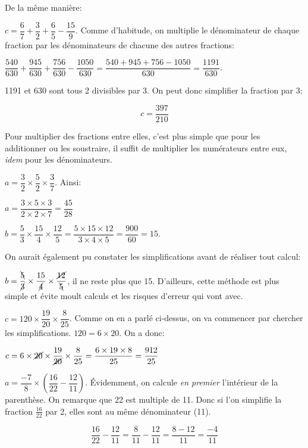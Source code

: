 \documentclass[a4paper,12pt]{scrartcl}
\begin{document}
\question{}
De la même manière:

$c = \dfrac{6}{7} + \dfrac{3}{2} + \dfrac{6}{5} - \dfrac{15}{9}$. Comme d'habitude, on multiplie le dénominateur de chaque fraction par les dénominateurs de chacune des autres fractions:

$\dfrac{540}{630} + \dfrac{945}{630} + \dfrac{756}{630} - \dfrac{1050}{630} = \dfrac{540+945+756-1050}{630} = \dfrac{1191}{630}$.

1191 et 630 sont tous 2 divisibles par 3. On peut donc simplifier la fraction par 3: 

$$c = \dfrac{397}{210}$$


Pour multiplier des fractions entre elles, c'est plus simple que pour les additionner ou les soustraire, il suffit de multiplier les numérateurs entre eux, \emph{idem} pour les dénominateurs. 

\question{}
$a = \dfrac{3}{2} \times \dfrac{5}{2} \times \dfrac{3}{7}$. Ainsi:

$a = \dfrac{3 \times 5 \times 3}{2 \times 2 \times 7} = \dfrac{45}{28}$

\question{}
$b = \dfrac{5}{3} \times \dfrac{15}{4} \times \dfrac{12}{5} = \dfrac{5 \times 15 \times 12}{3 \times 4 \times 5} = \dfrac{900}{60} = 15$.

On aurait également pu constater les simplifications avant de réaliser tout calcul: 

$b = \dfrac{\bcancel{5}}{\cancel{3}} \times \dfrac{15}{\cancel{4}} \times \dfrac{\cancel{12}}{\bcancel{5}}$, il ne reste plus que 15. D'ailleurs, cette méthode est plus simple et évite moult calculs et les risques d'erreur qui vont avec.

\question{}
$c = 120 \times \dfrac{19}{20} \times \dfrac{8}{25}$. Comme on en a parlé ci-dessus, on va commencer par chercher les simplifications. $120 = 6 \times 20$. On a donc:

$c = 6 \times \cancel{20} \times \dfrac{19}{\cancel{20}} \times \dfrac{8}{25} = \dfrac{6 \times 19 \times 8}{25} = \dfrac{912}{25}$


\question{}
$a = \dfrac{-7}{8} \times \left( \dfrac{16}{22} - \dfrac{12}{11} \right)$. Évidemment, on calcule \emph{en premier} l'intérieur de la parenthèse. On remarque que 22 est multiple de 11. Donc si l'on simplifie la fraction $\frac{16}{22}$ par 2, elles sont au même dénominateur (11). 

$$\dfrac{16}{22} - \dfrac{12}{11} = \dfrac{8}{11} - \dfrac{12}{11} = \dfrac{8-12}{11} = \dfrac{-4}{11}$$
\end{document}
